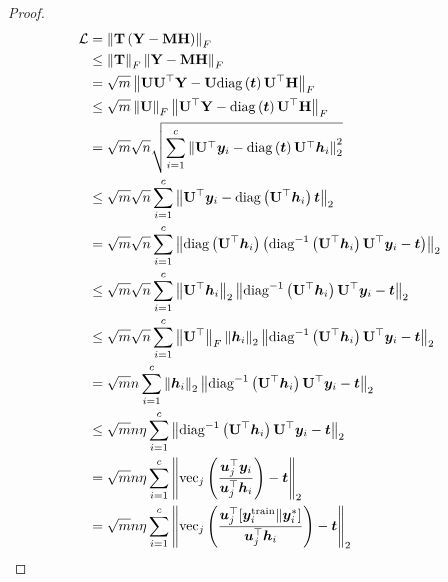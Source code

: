 \documentclass{article} %
\begin{document}
	\begin{proof}
		\begin{equation}
			\begin{aligned}
				{\mathcal{L}}&=\left\|{\mathbf{T}}\left({\mathbf{Y}}-{\mathbf{M}}{\mathbf{H}}\right)\right\|_F\\
				&\leq\left\|{\mathbf{T}}\right\|_F\left\|{\mathbf{Y}}-{\mathbf{M}}{\mathbf{H}}\right\|_F\\
				&=\sqrt{m}\left\|{\mathbf{U}}{\mathbf{U}}^{\top}{\mathbf{Y}}-{\mathbf{U}}\mathrm{diag}\left({\bm{t}}\right){\mathbf{U}}^{\top}{\mathbf{H}}\right\|_F\\
				&\leq\sqrt{m}\left\|{\mathbf{U}}\right\|_F\left\|{\mathbf{U}}^{\top}{\mathbf{Y}}-\mathrm{diag}\left({\bm{t}}\right){\mathbf{U}}^{\top}{\mathbf{H}}\right\|_F\\
				&=\sqrt{m}\sqrt{n}\sqrt{\sum_{i=1}^c\left\|{\mathbf{U}}^{\top}{\bm{y}}_i-\mathrm{diag}\left({\bm{t}}\right){\mathbf{U}}^{\top}{\bm{h}}_i\right\|^2_2}\\
				&\leq\sqrt{m}\sqrt{n}\sum_{i=1}^c\left\|{\mathbf{U}}^{\top}{\bm{y}}_i-\mathrm{diag}\left({\mathbf{U}}^{\top}{\bm{h}}_i\right){\bm{t}}\right\|_2\\
				&=\sqrt{m}\sqrt{n}\sum_{i=1}^c\left\|\mathrm{diag}\left({\mathbf{U}}^{\top}{\bm{h}}_i\right)\left(\mathrm{diag}^{-1}\left({\mathbf{U}}^{\top}{\bm{h}}_i\right){\mathbf{U}}^{\top}{\bm{y}}_i-{\bm{t}}\right)\right\|_2\\
				&\leq\sqrt{m}\sqrt{n}\sum_{i=1}^c\left\|{\mathbf{U}}^{\top}{\bm{h}}_i\right\|_2\left\|\mathrm{diag}^{-1}\left({\mathbf{U}}^{\top}{\bm{h}}_i\right){\mathbf{U}}^{\top}{\bm{y}}_i-{\bm{t}}\right\|_2\\
				&\leq\sqrt{m}\sqrt{n}\sum_{i=1}^c\left\|{\mathbf{U}}^{\top}\right\|_F\left\|{\bm{h}}_i\right\|_2\left\|\mathrm{diag}^{-1}\left({\mathbf{U}}^{\top}{\bm{h}}_i\right){\mathbf{U}}^{\top}{\bm{y}}_i-{\bm{t}}\right\|_2\\
				&=\sqrt{m}n\sum_{i=1}^c\left\|{\bm{h}}_i\right\|_2\left\|\mathrm{diag}^{-1}\left({\mathbf{U}}^{\top}{\bm{h}}_i\right){\mathbf{U}}^{\top}{\bm{y}}_i-{\bm{t}}\right\|_2\\
				&\leq\sqrt{m}n\eta\sum_{i=1}^c\left\|\mathrm{diag}^{-1}\left({\mathbf{U}}^{\top}{\bm{h}}_i\right){\mathbf{U}}^{\top}{\bm{y}}_i-{\bm{t}}\right\|_2\\
				&=\sqrt{m}n\eta\sum_{i=1}^c\left\|\mathrm{vec}_j\left(\frac{{\bm{u}}_j^{\top}{\bm{y}}_i}{{\bm{u}}_j^{\top}{\bm{h}}_i}\right)-{\bm{t}}\right\|_2\\
				&=\sqrt{m}n\eta\sum_{i=1}^c\left\|\mathrm{vec}_j\left(\frac{{\bm{u}}_j^{\top}[{\bm{y}}^{\textrm{train}}_i\|{\bm{y}}^*_i]}{{\bm{u}}_j^{\top}{\bm{h}}_i}\right)-{\bm{t}}\right\|_2
			\end{aligned}
		\end{equation}
	\end{proof}
	
\end{document}
